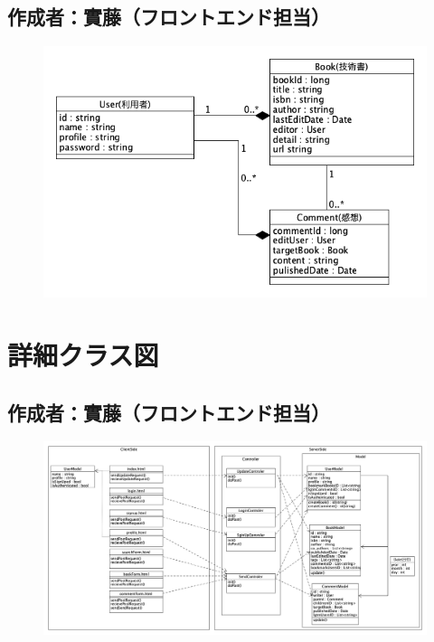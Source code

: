 \documentclass[dvipdfmx]{jsarticle}
\begin{document}
    \subsection*{\rm{作成者：實藤（フロントエンド担当）}}
    \begin{figure}[H]
        \begin{center}
            \includegraphics[scale=0.7,clip]{../Gainen.png}
        \end{center}
    \end{figure}

    \newpage

    \section*{詳細クラス図}
    \subsection*{\rm{作成者：實藤（フロントエンド担当）}}
    \begin{figure}[H]
        \begin{center}
            \includegraphics[scale=0.3,clip]{pictures/MVC.png}
        \end{center}
    \end{figure}
\end{document}
